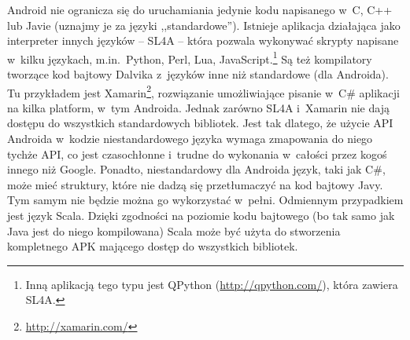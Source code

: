 Android nie ogranicza się do uruchamiania jedynie kodu napisanego w~C, C++ lub Javie (uznajmy je za języki ,,standardowe''). Istnieje aplikacja działająca jako interpreter innych języków -- SL4A\cite{android-sl4a} -- która pozwala wykonywać skrypty napisane w~kilku językach, m.in.\ Python, Perl, Lua, JavaScript.\footnote{Inną aplikacją tego typu jest QPython (\url{http://qpython.com/}), która zawiera SL4A.}
Są też kompilatory tworzące kod bajtowy Dalvika z~języków inne niż standardowe (dla Androida). Tu przykładem jest Xamarin\footnote{\url{http://xamarin.com/}}, rozwiązanie umożliwiające pisanie w~C\# aplikacji na kilka platform, w~tym Androida.
Jednak zarówno SL4A i~Xamarin nie dają dostępu do wszystkich standardowych bibliotek. Jest tak dlatego, że użycie API Androida w~kodzie niestandardowego języka wymaga zmapowania do niego tychże API, co jest czasochłonne i~trudne do wykonania w~całości przez kogoś innego niż Google. Ponadto, niestandardowy dla Androida język, taki jak C\#, może mieć struktury, które nie dadzą się przetłumaczyć na kod bajtowy Javy. Tym samym nie będzie można go wykorzystać w~pełni. Odmiennym przypadkiem jest język Scala. Dzięki zgodności na poziomie kodu bajtowego (bo tak samo jak Java jest do niego kompilowana) Scala może być użyta do stworzenia kompletnego APK mającego dostęp do wszystkich bibliotek.



